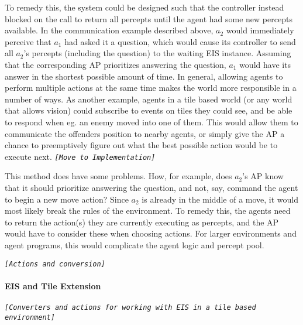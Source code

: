 To remedy this, the system could be designed such that the controller
instead blocked on the call to return all percepts until the agent
had some new percepts available. In the communication example described
above, $a_{2}$ would immediately perceive that $a_{1}$ had asked
it a question, which would cause its controller to send all $a_{2}$'s
percepts (including the question) to the waiting EIS instance. Assuming
that the corresponding AP prioritizes answering the question, $a_{1}$
would have its answer in the shortest possible amount of time. In
general, allowing agents to perform multiple actions at the same time
makes the world more responsible in a number of ways. As another example,
agents in a tile based world (or any world that allows vision) could
subscribe to events on tiles they could see, and be able to respond
when eg. an enemy moved into one of them. This would allow them to
communicate the offenders position to nearby agents, or simply give
the AP a chance to preemptively figure out what the best possible
action would be to execute next. \texttt{\emph{{[}Move to Implementation{]}}}

This method does have some problems. How, for example, does $a_{2}$'s
AP know that it should prioritize answering the question, and not,
say, command the agent to begin a new move action? Since $a_{2}$
is already in the middle of a move, it would most likely break the
rules of the environment. To remedy this, the agents need to return
the action(s) they are currently executing as percepts, and the AP
would have to consider these when choosing actions. For larger environments
and agent programs, this would complicate the agent logic and percept
pool.

\texttt{\emph{{[}Actions and conversion{]}}}


\paragraph*{EIS and Tile Extension}

\texttt{\emph{{[}Converters and actions for working with EIS in a
tile based environment{]}}}
